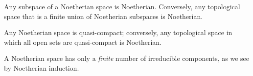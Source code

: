 \begin{env}[2.2.3]
\label{0.2.2.3}
Any subspace of a Noetherian space is Noetherian.
Conversely, any topological space that is a finite union of Noetherian subspaces is Noetherian.
\end{env}

\begin{env}[2.2.4]
\label{0.2.2.4}
Any Noetherian space is quasi-compact; conversely, any topological space in which all open sets are quasi-compact is Noetherian.
\end{env}

\begin{env}[2.2.5]
\label{0.2.2.5}
A Noetherian space has only a \emph{finite} number of irreducible components, as we see by Noetherian induction.
\end{env}


